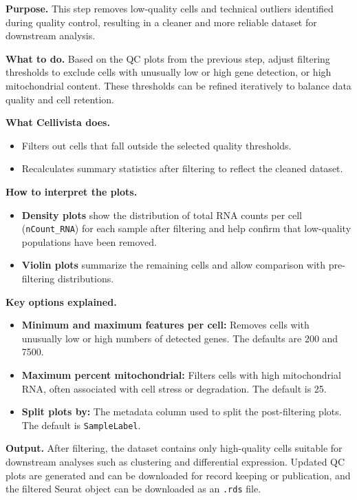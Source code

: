 \documentclass[11pt]{article}
\begin{document}
\textbf{Purpose.}  
This step removes low-quality cells and technical outliers identified during quality control, resulting in a cleaner and more reliable dataset for downstream analysis.

\textbf{What to do.}  
Based on the QC plots from the previous step, adjust filtering thresholds to exclude cells with unusually low or high gene detection, or high mitochondrial content. These thresholds can be refined iteratively to balance data quality and cell retention.

\textbf{What Cellivista does.}
\begin{itemize}[leftmargin=*,nosep]
\item Filters out cells that fall outside the selected quality thresholds.
\item Recalculates summary statistics after filtering to reflect the cleaned dataset.
\end{itemize}

\textbf{How to interpret the plots.}
\begin{itemize}[leftmargin=*,nosep]
\item \textbf{Density plots} show the distribution of total RNA counts per cell (\texttt{nCount\_RNA}) for each sample after filtering and help confirm that low-quality populations have been removed.
\item \textbf{Violin plots} summarize the remaining cells and allow comparison with pre-filtering distributions.
\end{itemize}

\textbf{Key options explained.}
\begin{itemize}[leftmargin=*,nosep]
\item \textbf{Minimum and maximum features per cell:} Removes cells with unusually low or high numbers of detected genes. The defaults are 200 and 7500.
\item \textbf{Maximum percent mitochondrial:} Filters cells with high mitochondrial RNA, often associated with cell stress or degradation. The default is 25.
\item \textbf{Split plots by:} The metadata column used to split the post-filtering plots. The default is \texttt{SampleLabel}.
\end{itemize}

\textbf{Output.}  
After filtering, the dataset contains only high-quality cells suitable for downstream analyses such as clustering and differential expression. Updated QC plots are generated and can be downloaded for record keeping or publication, and the filtered Seurat object can be downloaded as an \texttt{.rds} file.
\end{document}
